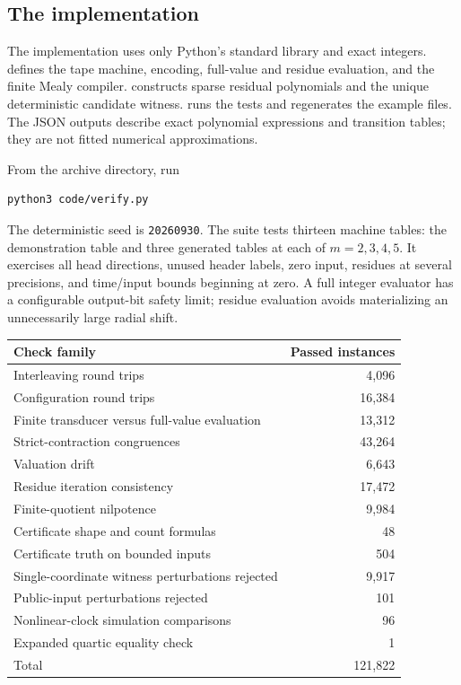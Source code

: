 \documentclass[11pt,letterpaper]{article}
\numberwithin{equation}{section}
\theoremstyle{definition}
\theoremstyle{remark}
\begin{document}
\subsection{The implementation}
The implementation uses only Python's standard library and exact integers.
 defines the tape machine, encoding,
full-value and residue evaluation, and the finite Mealy compiler.
 constructs sparse residual
polynomials and the unique deterministic candidate witness.
 runs the tests and regenerates the example files.
The JSON outputs describe exact polynomial expressions and transition
tables; they are not fitted numerical approximations.

From the archive directory, run
\begin{lstlisting}
python3 code/verify.py
\end{lstlisting}
The deterministic seed is \texttt{20260930}. The suite tests thirteen
machine tables: the demonstration table and three generated tables at each
of $m=2,3,4,5$. It exercises all head directions, unused header labels,
zero input, residues at several precisions, and time/input bounds beginning
at zero. A full integer evaluator has a configurable output-bit safety
limit; residue evaluation avoids materializing an unnecessarily large
radial shift.

\begin{center}
\begin{tabular}{@{}lr@{}}
\toprule
Check family & Passed instances\\
\midrule
Interleaving round trips & 4,096\\
Configuration round trips & 16,384\\
Finite transducer versus full-value evaluation & 13,312\\
Strict-contraction congruences & 43,264\\
Valuation drift & 6,643\\
Residue iteration consistency & 17,472\\
Finite-quotient nilpotence & 9,984\\
Certificate shape and count formulas & 48\\
Certificate truth on bounded inputs & 504\\
Single-coordinate witness perturbations rejected & 9,917\\
Public-input perturbations rejected & 101\\
Nonlinear-clock simulation comparisons & 96\\
Expanded quartic equality check & 1\\
\midrule
Total & 121,822\\
\bottomrule
\end{tabular}
\end{center}
\end{document}
